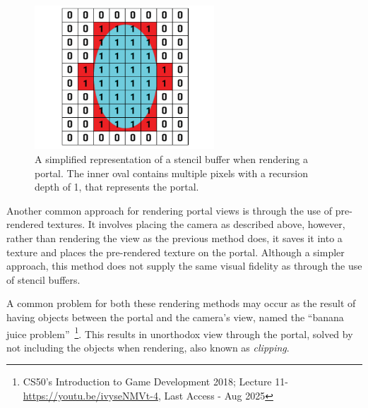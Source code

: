 \begin{figure}[b]
    \centering
     \includegraphics[width=0.6\textwidth]{NOVAthesisFiles/Images/papers/stencil buffer.png}
     \caption[Simplified representation of a stencil buffer for rendering portals.]
     {A simplified representation of a stencil buffer when rendering a portal. The inner oval contains multiple pixels with a recursion depth of 1,
     that represents the portal.}
     \label{fig:stencil-buffer}
\end{figure}


Another common approach for rendering portal views is through the use of pre-rendered textures. It involves placing the camera as described above, however, rather 
than rendering the view as the previous method does, it saves it into a texture and places the pre-rendered texture on the portal. Although a 
simpler approach, this method does not supply the same visual fidelity as through the use of stencil buffers.

A common problem for both these rendering methods may occur as the result of having objects between the portal and the camera's view, 
named the “banana juice problem”~\footnote{CS50's Introduction to Game Development 2018; Lecture 11- \href{https://youtu.be/ivyseNMVt-4}{https://youtu.be/ivyseNMVt-4}, Last Access - Aug 2025 }. 
This results in unorthodox view through the portal, solved by not including the objects when rendering, 
also known as \textit{clipping}.

